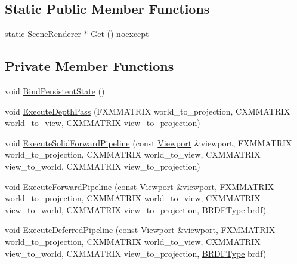 \subsection*{Static Public Member Functions}
\begin{DoxyCompactItemize}
\item 
static \hyperlink{classmage_1_1_scene_renderer}{Scene\+Renderer} $\ast$ \hyperlink{classmage_1_1_scene_renderer_a3b0e9204ffaef1cf4022c3e129eb37b7}{Get} () noexcept
\end{DoxyCompactItemize}
\subsection*{Private Member Functions}
\begin{DoxyCompactItemize}
\item 
void \hyperlink{classmage_1_1_scene_renderer_a889e34c56566bdd270111b1ac2b0b810}{Bind\+Persistent\+State} ()
\item 
void \hyperlink{classmage_1_1_scene_renderer_a860ba5904dcd5e7a71d0b66783728c4a}{Execute\+Depth\+Pass} (F\+X\+M\+M\+A\+T\+R\+IX world\+\_\+to\+\_\+projection, C\+X\+M\+M\+A\+T\+R\+IX world\+\_\+to\+\_\+view, C\+X\+M\+M\+A\+T\+R\+IX view\+\_\+to\+\_\+projection)
\item 
void \hyperlink{classmage_1_1_scene_renderer_a8571e22282629b8e53395b4d6aa25b95}{Execute\+Solid\+Forward\+Pipeline} (const \hyperlink{structmage_1_1_viewport}{Viewport} \&viewport, F\+X\+M\+M\+A\+T\+R\+IX world\+\_\+to\+\_\+projection, C\+X\+M\+M\+A\+T\+R\+IX world\+\_\+to\+\_\+view, C\+X\+M\+M\+A\+T\+R\+IX view\+\_\+to\+\_\+world, C\+X\+M\+M\+A\+T\+R\+IX view\+\_\+to\+\_\+projection)
\item 
void \hyperlink{classmage_1_1_scene_renderer_a54ce5ee2e29c806d8aaf449fb0ca560e}{Execute\+Forward\+Pipeline} (const \hyperlink{structmage_1_1_viewport}{Viewport} \&viewport, F\+X\+M\+M\+A\+T\+R\+IX world\+\_\+to\+\_\+projection, C\+X\+M\+M\+A\+T\+R\+IX world\+\_\+to\+\_\+view, C\+X\+M\+M\+A\+T\+R\+IX view\+\_\+to\+\_\+world, C\+X\+M\+M\+A\+T\+R\+IX view\+\_\+to\+\_\+projection, \hyperlink{namespacemage_ae7a7a03a7b34d7e2689689bb8295cd38}{B\+R\+D\+F\+Type} brdf)
\item 
void \hyperlink{classmage_1_1_scene_renderer_a5a8b5e738debc0d429fd7f09f1061ec1}{Execute\+Deferred\+Pipeline} (const \hyperlink{structmage_1_1_viewport}{Viewport} \&viewport, F\+X\+M\+M\+A\+T\+R\+IX world\+\_\+to\+\_\+projection, C\+X\+M\+M\+A\+T\+R\+IX world\+\_\+to\+\_\+view, C\+X\+M\+M\+A\+T\+R\+IX view\+\_\+to\+\_\+world, C\+X\+M\+M\+A\+T\+R\+IX view\+\_\+to\+\_\+projection, \hyperlink{namespacemage_ae7a7a03a7b34d7e2689689bb8295cd38}{B\+R\+D\+F\+Type} brdf)
\end{DoxyCompactItemize}
